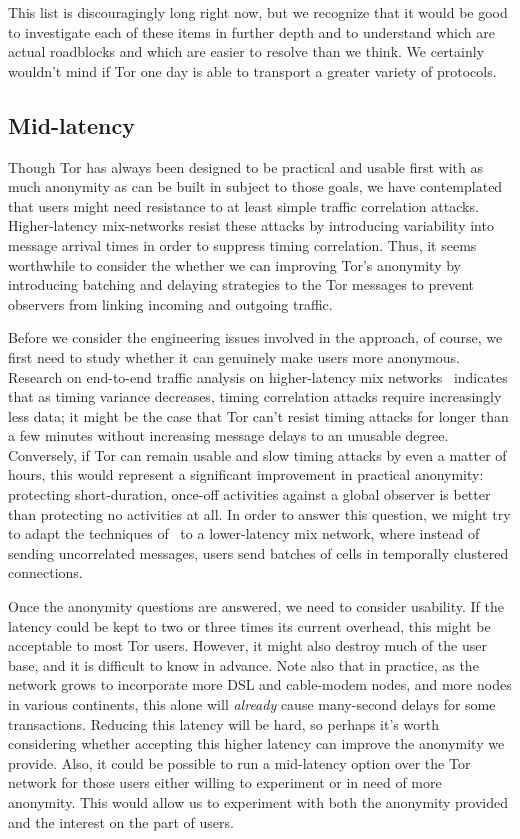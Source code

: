 \documentclass{llncs}
\begin{document}
This list is discouragingly long right now, but we recognize that it
would be good to investigate each of these items in further depth and to
understand which are actual roadblocks and which are easier to resolve
than we think. We certainly wouldn't mind if Tor one day is able to
transport a greater variety of protocols.

\subsection{Mid-latency}
\label{subsec:mid-latency}

Though Tor has always been designed to be practical and usable first
with as much anonymity as can be built in subject to those goals, we
have contemplated that users might need resistance to at least simple
traffic correlation attacks.  Higher-latency mix-networks resist these
attacks by introducing variability into message arrival times in order to
suppress timing correlation.  Thus, it seems worthwhile to consider the
whether we can improving Tor's anonymity by introducing batching and delaying
strategies to the Tor messages to prevent observers from linking incoming and
outgoing traffic.

Before we consider the engineering issues involved in the approach, of
course, we first need to study whether it can genuinely make users more
anonymous.  Research on end-to-end traffic analysis on higher-latency mix
networks~\cite{e2e-traffic} indicates that as timing variance decreases,
timing correlation attacks require increasingly less data; it might be the
case that Tor can't resist timing attacks for longer than a few minutes
without increasing message delays to an unusable degree.  Conversely, if Tor
can remain usable and slow timing attacks by even a matter of hours, this
would represent a significant improvement in practical anonymity: protecting
short-duration, once-off activities against a global observer is better than
protecting no activities at all.  In order to answer this question, we might
try to adapt the techniques of~\cite{e2e-traffic} to a lower-latency mix
network, where instead of sending uncorrelated messages, users send batches
of cells in temporally clustered connections.

Once the anonymity questions are answered, we need to consider usability.  If
the latency could be kept to two or three times its current overhead, this
might be acceptable to most Tor users. However, it might also destroy much of
the user base, and it is difficult to know in advance.  Note also that in
practice, as the network grows to incorporate more DSL and cable-modem nodes,
and more nodes in various continents, this alone will \emph{already} cause
many-second delays for some transactions.  Reducing this latency will be
hard, so perhaps it's worth considering whether accepting this higher latency
can improve the anonymity we provide.  Also, it could be possible to
run a mid-latency option over the Tor network for those
users either willing to experiment or in need of more
anonymity.  This would allow us to experiment with both
the anonymity provided and the interest on the part of users.
\end{document}
